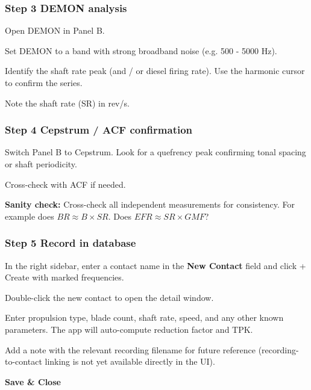 \setcounter{myenum}{\value{enumi}}

\subsubsection{Step 3 DEMON analysis}
\begin{compactenum}
\setcounter{enumi}{\value{myenum}}
    \item Open DEMON in Panel B.
    \item Set DEMON to a band with strong broadband noise (e.g. 500 - 5000 Hz).
    \item Identify the shaft rate peak (and / or diesel firing rate). Use the harmonic cursor to confirm the series.
    \item Note the shaft rate (SR) in rev/s.
\end{compactenum}

\setcounter{myenum}{\value{enumi}}

\subsubsection{Step 4 Cepstrum / ACF confirmation}
\begin{compactenum}
\setcounter{enumi}{\value{myenum}}  
    \item Switch Panel B to Cepstrum. Look for a quefrency peak confirming tonal spacing or shaft periodicity.
    \item Cross-check with ACF if needed.
\end{compactenum}

\setcounter{myenum}{\value{enumi}}

\textbf{Sanity check: }Cross-check all independent measurements for consistency. For example does $BR \approx B \times SR$. Does $EFR \approx SR \times GMF$?

\subsubsection{Step 5 Record in database}
\begin{compactenum}
\setcounter{enumi}{\value{myenum}}
    \item In the right sidebar, enter a contact name in the \textbf{New Contact} field and click + Create with marked frequencies.
    \item Double-click the new contact to open the detail window.
    \item Enter propulsion type, blade count, shaft rate, speed, and any other known parameters. The app will auto-compute reduction factor and TPK.
    \item Add a note with the relevant recording filename for future reference (recording-to-contact linking is not yet available directly in the UI).
    \item \textbf{Save \& Close}
\end{compactenum}
\pagebreak